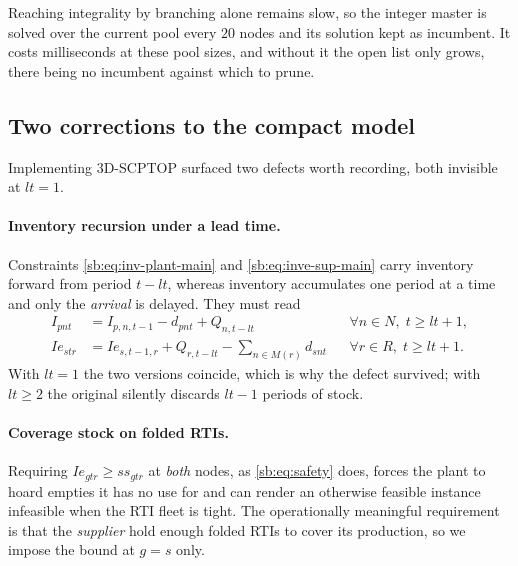 Reaching integrality by branching alone remains slow, so the integer
master is solved over the current pool every $20$ nodes and its
solution kept as incumbent. It costs milliseconds at these pool sizes,
and without it the open list only grows, there being no incumbent
against which to prune.





\subsection{Two corrections to the compact model}
\label{sec:corrections}

Implementing 3D-SCPTOP surfaced two defects worth recording, both
invisible at $lt=1$.

\paragraph{Inventory recursion under a lead time.}
Constraints \eqref{sb:eq:inv-plant-main} and
\eqref{sb:eq:inve-sup-main} carry inventory forward from period
$t-lt$, whereas inventory accumulates one period at a time and only
the \emph{arrival} is delayed. They must read
\begin{align}
I_{pnt}  &=I_{p,n,t-1}-d_{pnt}+Q_{n,t-lt}
    &&\forall n\in N,\; t\ge lt+1,
    \label{eq:fix-plant}\\
Ie_{str} &=Ie_{s,t-1,r}+Q_{r,t-lt}-\textstyle\sum_{n\in M(r)} d_{snt}
    &&\forall r\in R,\; t\ge lt+1.
    \label{eq:fix-sup}
\end{align}
With $lt=1$ the two versions coincide, which is why the defect
survived; with $lt\ge2$ the original silently discards $lt-1$ periods
of stock.

\paragraph{Coverage stock on folded RTIs.}
Requiring $Ie_{gtr}\ge ss_{gtr}$ at \emph{both} nodes, as
\eqref{sb:eq:safety} does, forces the plant to hoard empties it has
no use for and can render an otherwise feasible instance infeasible
when the RTI fleet is tight. The operationally meaningful requirement
is that the \emph{supplier} hold enough folded RTIs to cover its
production, so we impose the bound at $g=s$ only.

\endgroup
